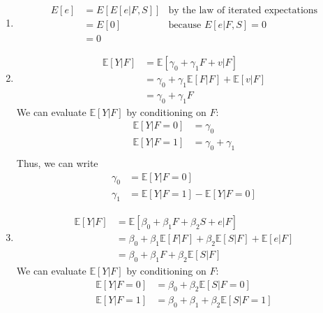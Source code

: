 \documentclass[10pt]{article}
\newcommand{\E}{\mathbb{E}}
\newenvironment{problem}[2][Problem]{\begin{trivlist}
\item[\hskip \labelsep {\bfseries #1}\hskip \labelsep {\bfseries #2.}]}{\end{trivlist}}
\begin{document}
\begin{problem}{4}
    \hfill
    \begin{enumerate}[label=(\alph*)]
        \item \hfill
            \begin{align*}
                E[e] &= E[E[e | F, S]] & \text{by the law of iterated expectations} \\
                     &= E[0] & \text{because $E[e | F, S] = 0$} \\
                     &= 0
            \end{align*}
        \item \hfill
            \begin{align*}
                \E[Y | F] &= \E[\gamma_0 + \gamma_1 F + v | F] \\
                          &= \gamma_0 + \gamma_1 \E[F | F] + \E[v | F] \\
                          &= \gamma_0 + \gamma_1 F
            \end{align*}
            We can evaluate $\E[Y | F]$ by conditioning on $F$:
            \begin{align*}
                \E[Y | F = 0] &= \gamma_0 \\
                \E[Y | F = 1] &= \gamma_0 + \gamma_1 \\
            \end{align*}
            Thus, we can write
            \begin{align*}
                \gamma_0 &= \E[Y | F = 0] \\
                \gamma_1 &= \E[Y | F = 1] - \E[Y | F = 0]
            \end{align*}
        \item \hfill
            \begin{align*}
                \E[Y | F] &= \E[\beta_0 + \beta_1 F + \beta_2 S + e | F] \\
                             &= \beta_0 + \beta_1 \E[F | F] + \beta_2 \E[S | F] + \E[e | F] \\
                             &= \beta_0 + \beta_1 F + \beta_2 \E[S | F] 
            \end{align*}
            We can evaluate $\E[Y | F]$ by conditioning on $F$:
            \begin{align*}
                \E[Y | F = 0] &= \beta_0 + \beta_2 \E[S | F = 0] \\
                \E[Y | F = 1] &= \beta_0 + \beta_1 + \beta_2 \E[S | F = 1] \\

\end{align*}
\end{enumerate}
\end{problem}
\end{document}
